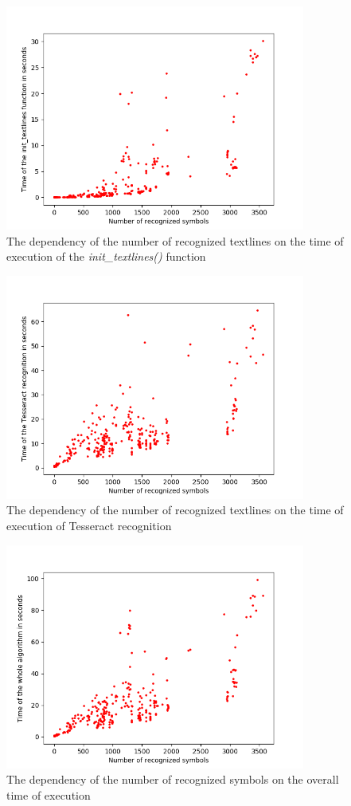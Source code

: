 \begin{figure}
\centering
\includegraphics[height=20em]{img/results/symbolsTimeInit.png}
\caption{The dependency of the number of recognized textlines on the time of execution of the \emph{init\_textlines()} function}
\label{fig:symbolsTimeInit}
\end{figure}

\begin{figure}
\centering
\includegraphics[height=20em]{img/results/symbolsTimeTesseract.png}
\caption{The dependency of the number of recognized textlines on the time of execution of Tesseract recognition}
\label{fig:symbolsTimeTess}
\end{figure}

\begin{figure}
\centering
\includegraphics[height=20em]{img/results/symbolsTimeAll.png}
\caption{The dependency of the number of recognized symbols on the overall time of execution}
\label{fig:symbolsTime}
\end{figure}

